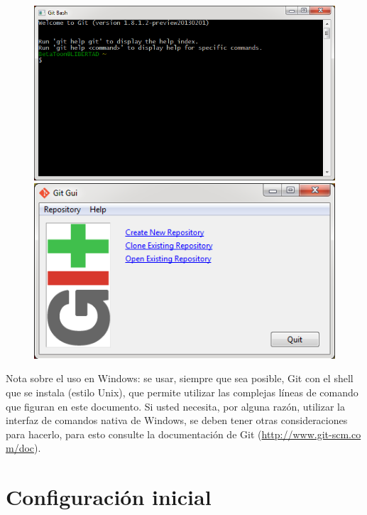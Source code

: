 \documentclass[12pt, spanish, oneside, onecolumn, a4paper]{report}
\begin{document}
\begin{figure}[hb] 
  \begin{center} 
    \includegraphics[width=.5\textwidth,keepaspectratio=true]{7.png} 
  \end{center} 
  \begin{center} 
    \includegraphics[width=.5\textwidth,keepaspectratio=true]{8.png} 
  \end{center} 
\end{figure} Nota sobre el uso en Windows: se usar, siempre que sea posible, Git con el shell que se instala (estilo Unix), que permite utilizar las complejas líneas de comando que figuran en este documento. Si usted necesita, por alguna razón, utilizar la interfaz de comandos nativa de Windows, se deben tener otras consideraciones para hacerlo, para esto consulte la documentación de Git (\url{http://www.git-scm.co m/doc}).

\clearpage

\section{Configuración inicial} 
\label{sec:initialsetup} 
\end{document}
